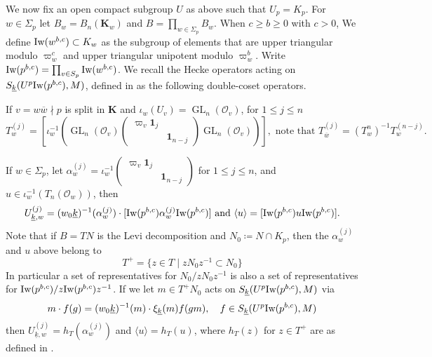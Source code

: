 \documentclass[leqno]{amsart}
\newcommand{\wt}[1]{\underline{ #1 }}
\newcommand{\Iw}{\textnormal{Iw}}
\newcommand{\bw}{\overline{w}}
\DeclareMathOperator{\GL}{GL}
\newcommand{\id}{\mathbf{1}}
\newcommand{\K}{{\mathbf{K}}} %
\newcommand{\oo}{\mathcal{O}} %
\theoremstyle{definition}
\theoremstyle{remark}
\begin{document}
We now fix an open compact subgroup $U$ as above
such that $U_p=K_p$.
For $w\in \Sigma_p$ let $B_w=B_n(\K_w)$
and  $B=\prod_{w\in \Sigma_p}B_w$.
When $c\geq b\geq 0$ with  $c>0$, 
We define $\Iw(w^{b,c})\subset K_w$
as the subgroup of elements
that are upper triangular modulo $\varpi_w^c$ and 
upper triangular unipotent modulo $\varpi_w^b$.
Write $\Iw(p^{b,c})=\prod_{v\in S_p}\Iw(w^{b,c})$.
We recall 
the Hecke operators 
acting on $S_{\wt{k}}(U^p\Iw(p^{b,c}),M)$,
defined in \cite[\S 2.3]{ger}
as the following double-coset operators.

If $v=w\bw\nmid p$ is split in  $\K$
and  $\iota_w(U_v)=\GL_n(\oo_v)$, 
for $1\leq j\leq n$
\begin{equation}
	T_w^{(j)}=
	\left[\iota_w^{-1}\left(
	\GL_n(\oo_v)
	\begin{pmatrix}
		\varpi_v\id_{j}&\\&\id_{n-j}
	\end{pmatrix}
	\GL_n(\oo_v)
	\right)\right],
	\text{ note that }
	T_{\bw}^{(j)}=(T_{w}^{{n}})^{-1}T_w^{(n-j)}.
\end{equation}

If $w\in \Sigma_p$, let  
$\alpha_w^{(j)}=\iota_w^{-1}
\left(\begin{smallmatrix}
\varpi_v\id_{j}&\\&\id_{n-j} 
\end{smallmatrix}\right)$ for $1\leq j\leq n$,
and $u\in \iota_w^{-1}(T_n(\oo_w))$, then 
\begin{equation}
	U_{\wt{k},w}^{(j)}=
	(w_0\wt{k})^{-1}(\alpha_{w}^{(j)})\cdot
	[\Iw(p^{b,c})\alpha_w^{(j)}\Iw(p^{b,c})]
	\text{ and }
	\langle u\rangle= [\Iw(p^{b,c})u\Iw(p^{b,c})].
\end{equation}
Note that if $B=TN$ is the Levi decomposition
and  $N_0\coloneqq N\cap K_p$,
then the $\alpha_w^{(j)}$ and $u$ above belong to 
\[
	T^+=\{z\in T\mid zN_0z^{-1}\subset N_0\}
\]
In particular a set of representatives for $N_0/zN_0z^{-1}$ 
is also a set of representatives for $\Iw(p^{b,c})/z\Iw(p^{b,c})z^{-1}$.
If we let $m\in T^+N_0$ acts on  $S_{\wt{k}}(U^p\Iw(p^{b,c}),M)$ via 
\begin{equation}\label{eq:eme_action}
	m\cdot f(g)=(w_0\wt{k})^{-1}(m)\cdot \xi_{\wt{k}}(m)f(gm),\quad
	f\in S_{\wt{k}}(U^p\Iw(p^{b,c}),M)
\end{equation}
then $U_{\wt{k},w}^{(j)}=h_T(\alpha_w^{(j)})$ and $\langle u\rangle=h_T(u)$,
where $h_T(z)$ for $z\in T^+$ are as defined in 
\cite[Def 3.1.3]{emeI}.
\end{document}
